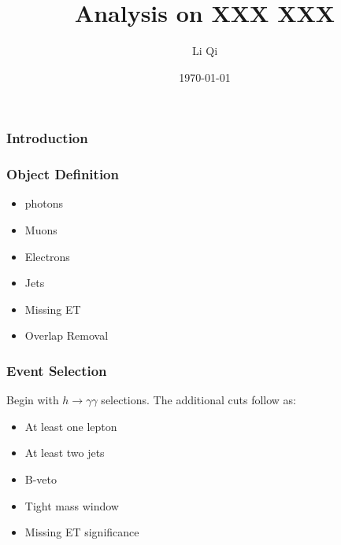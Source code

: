\documentclass[preprint,review,16px]{beamer}
\date{\today}
\begin{document}
\title{Analysis on XXX XXX}
\author{Li Qi}
\thispagestyle{empty}
\maketitle


\begin{frame}%
\setcounter{page}{1}
\vspace{3mm}
\frametitle{Introduction}


\vspace{3mm}
\end{frame}


\begin{frame}%
\vspace{3mm}
\frametitle{Object Definition}
  \begin{itemize}
    \item photons
    \item Muons
    \item Electrons
    \item Jets
    \item Missing ET
    \item Overlap Removal
  \end{itemize}

\vspace{3mm}
\end{frame}


\begin{frame}%
\vspace{3mm}
\frametitle{Event Selection}
Begin with $h\rightarrow \gamma\gamma$ selections. The additional cuts follow as:
  \begin{itemize}
    \item At least one lepton
    \item At least two jets
    \item B-veto
    \item Tight mass window
    \item Missing ET significance
  \end{itemize}
\vspace{3mm}
\end{frame}
\end{document}
